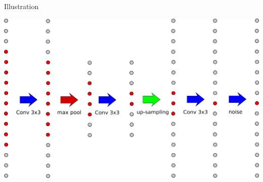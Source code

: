 \documentclass[xcolor=pdftex,dvipsnames,table,mathserif]{beamer}
\begin{document}
\begin{frame}{Illustration}

  \includegraphics[width=\textwidth]{receptive_field.png}
\end{frame}
\end{document}
